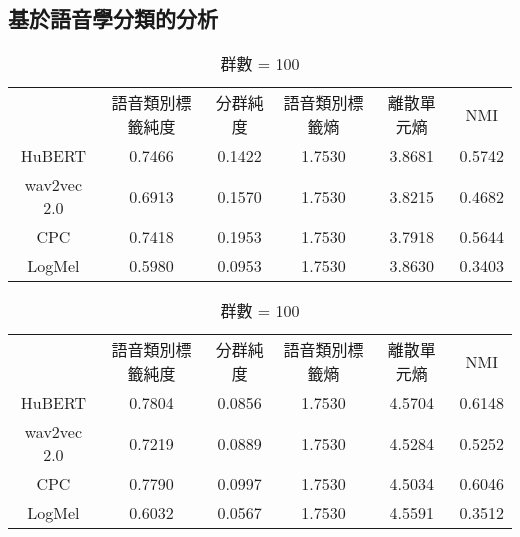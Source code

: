 \subsection{基於語音學分類的分析}

        \begin{table}[!htbp]
            \centering
            \begin{subtable}[t]{\textwidth}
                \centering
                \begin{tabular}{cccccc}
                                & 語音類別標籤純度 & 分群純度 & 語音類別標籤熵 & 離散單元熵 &     NMI \\
                    HuBERT      &           0.7466 &   0.1422 &         1.7530 &     3.8681 &  0.5742 \\   %
                    wav2vec 2.0 &           0.6913 &   0.1570 &         1.7530 &     3.8215 &  0.4682 \\   %
                    CPC         &           0.7418 &   0.1953 &         1.7530 &     3.7918 &  0.5644 \\   %
                    LogMel      &           0.5980 &   0.0953 &         1.7530 &     3.8630 &  0.3403 \\   %
                \end{tabular}
                \caption{群數 = 50}
                \label{tab:ch3-clu050}
            \end{subtable}        

            \vspace{0.5cm}        

            \begin{subtable}[t]{\textwidth}
                \centering
                \begin{tabular}{cccccc}
                                & 語音類別標籤純度 & 分群純度 & 語音類別標籤熵 & 離散單元熵 &     NMI \\
                    HuBERT      &           0.7804 &   0.0856 &         1.7530 &     4.5704 &  0.6148 \\   %
                    wav2vec 2.0 &           0.7219 &   0.0889 &         1.7530 &     4.5284 &  0.5252 \\   %
                    CPC         &           0.7790 &   0.0997 &         1.7530 &     4.5034 &  0.6046 \\   %
                    LogMel      &           0.6032 &   0.0567 &         1.7530 &     4.5591 &  0.3512 \\   %
                \end{tabular}
                \caption{群數 = 100}
                \label{tab:ch3-clu100}
            \end{subtable}        


\end{table}
